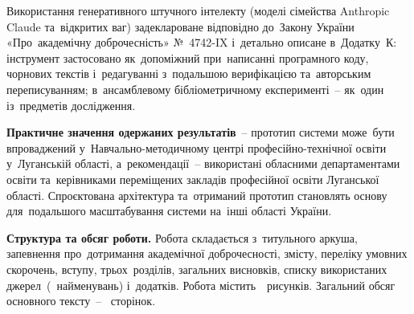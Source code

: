 Використання генеративного штучного інтелекту (моделі сімейства Anthropic Claude та~відкритих ваг) задеклароване відповідно до~Закону України «Про~академічну доброчесність» №~4742-IX і~детально описане в~Додатку~К: інструмент застосовано як~допоміжний при~написанні програмного коду, чорнових текстів і~редагуванні з~подальшою верифікацією та~авторським переписуванням; в~ансамблевому бібліометричному експерименті~-- як~один із~предметів дослідження.

\textbf{Практичне значення одержаних результатів}~-- прототип системи може~бути впроваджений у~Навчально-методичному центрі професійно-технічної освіти у~Луганській області, а~рекомендації~-- використані обласними департаментами освіти та~керівниками переміщених закладів професійної освіти Луганської області. Спроєктована архітектура та~отриманий прототип становлять основу для~подальшого масштабування системи на~інші області України.

\textbf{Структура та обсяг роботи.} Робота складається з~титульного аркуша, запевнення про~дотримання академічної доброчесності, змісту, переліку умовних скорочень, вступу, трьох~розділів, загальних висновків, списку використаних джерел~(~найменувань) і~додатків. Робота містить~\totalfigures\ рисунків. Загальний обсяг основного тексту~-- \pageref{main_text_end}~сторінок.
